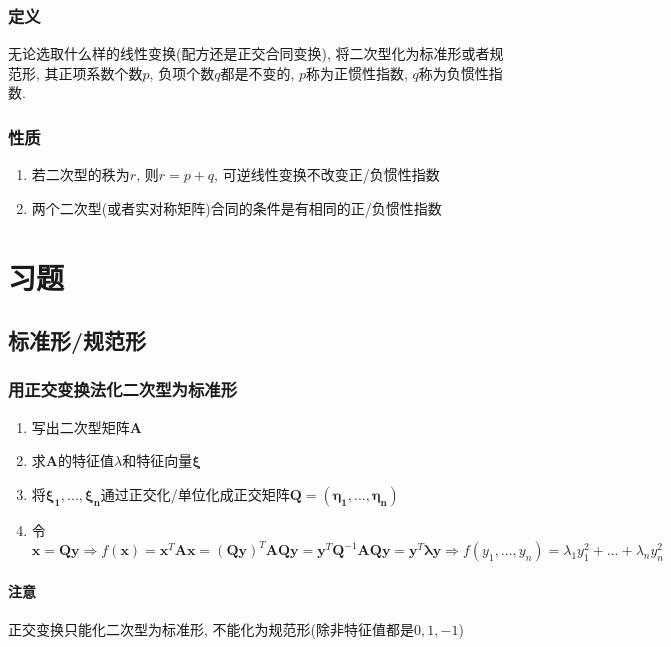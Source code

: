 \documentclass[oneside, onecolumn]{ctexbook}
\begin{document}
\subsubsection{定义}
无论选取什么样的线性变换(配方还是正交合同变换), 将二次型化为标准形或者规范形, 其正项系数个数$ p $, 负项个数$ q $都是不变的, $ p $称为正惯性指数, $ q $称为负惯性指数.
\subsubsection{性质}
\begin{enumerate}
	\item 若二次型的秩为$ r $, 则$ r=p+q $, 可逆线性变换不改变正/负惯性指数
	\item 两个二次型(或者实对称矩阵)合同的条件是有相同的正/负惯性指数
\end{enumerate}
\section{习题}
\subsection{标准形/规范形}
\subsubsection{用正交变换法化二次型为标准形}
\begin{enumerate}\label{ref:求标准形}
	\item 写出二次型矩阵$ \bm{A} $
	\item 求$ \bm{A} $的特征值$ \lambda $和特征向量$ \bm{\xi} $
	\item 将$ \bm{\xi_{1}},..., \bm{\xi_{n}} $通过正交化/单位化成正交矩阵$ \bm{Q}=(\bm{\eta_{1}},..., \bm{\eta_{n}}) $
	\item 令$ \bm{x}=\bm{Q}\bm{y}\Rightarrow f(\bm{x})=\bm{x}^{T}\bm{A}\bm{x}=(\bm{Q}\bm{y})^{T}\bm{A}\bm{Q}\bm{y}=\bm{y}^{T}\bm{Q}^{-1}\bm{A}\bm{Q}\bm{y}=\bm{y}^{T}\bm{\lambda}\bm{y}\Rightarrow f(y_{1},..., y_{n})=\lambda_{1}y_{1}^{2}+... +\lambda_{n}y_{n}^{2} $ 
\end{enumerate}
\paragraph{注意} 正交变换只能化二次型为标准形, 不能化为规范形(除非特征值都是$ 0, 1, -1 $)
\end{document}
